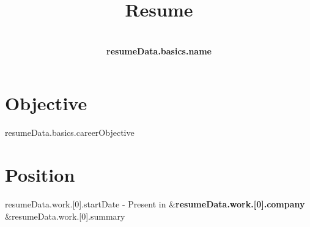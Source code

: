 \documentclass[10pt]{article}
\renewcommand{\maketitle}{
\begin{center}
{\huge\bfseries
\theauthor}

\end{center}
}
\begin{document}
\title{Resume}
\author{\huge\bfseries\\{{resumeData.basics.name}}}
\maketitle

\section{Objective}
{{resumeData.basics.careerObjective}}



\section{Position}
{{resumeData.work.[0].startDate}} - Present in &{\vspace{.25em}\bf {{resumeData.work.[0].company}}}\\&{{resumeData.work.[0].summary}}
\end{document}
